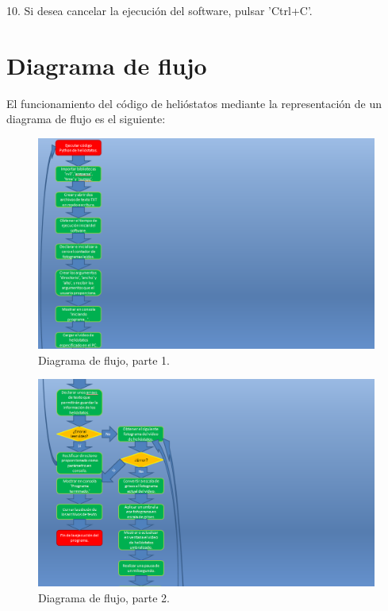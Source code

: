 10. Si desea cancelar la ejecución del software, pulsar 'Ctrl+C'.

\section{Diagrama de flujo}

El funcionamiento del código de helióstatos mediante la representación de un diagrama de flujo es el siguiente:

\begin{figure}[h!]
  	\centering
	\includegraphics[width=\textwidth]{DiagramaFlujoSoftwareTFG/diagramaFlujo1.PNG}
	\caption{Diagrama de flujo, parte 1.
	\label{fig:DiagramaFlujoSoftwareTFG/diagramaFlujo1.PNG}}
\end{figure}

\begin{figure}[h!]
  	\centering
	\includegraphics[width=\textwidth]{DiagramaFlujoSoftwareTFG/diagramaFlujo2.PNG}
	\caption{Diagrama de flujo, parte 2.
	\label{fig:DiagramaFlujoSoftwareTFG/diagramaFlujo2.PNG}}
\end{figure}

